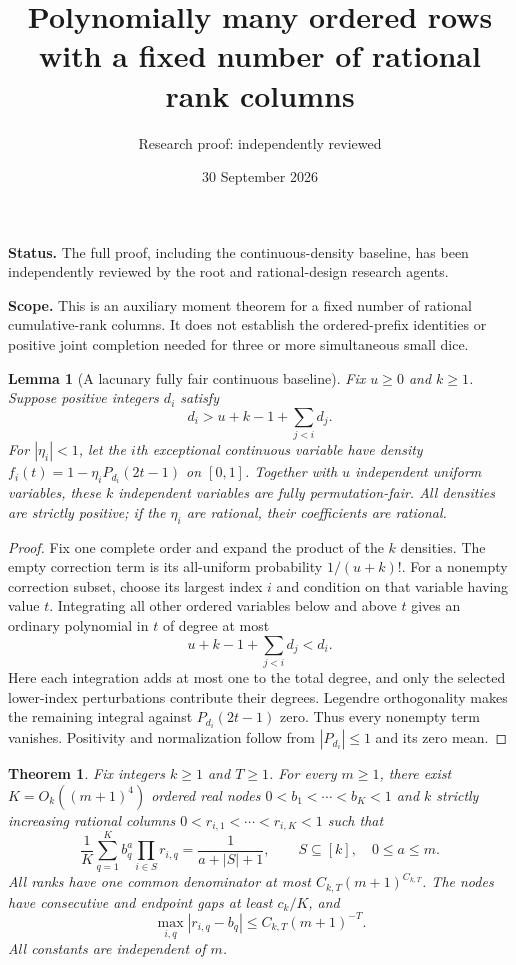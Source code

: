 \documentclass[11pt]{article}
\title{Polynomially many ordered rows with a fixed number of rational rank columns}
\author{Research proof: independently reviewed}
\date{30 September 2026}
\newtheorem{theorem}{Theorem}
\newtheorem{lemma}{Lemma}
\begin{document}
\maketitle
\noindent\textbf{Status.} The full proof, including the continuous-density
baseline, has been independently reviewed by the root and rational-design
research agents.
\medskip

\noindent\textbf{Scope.} This is an auxiliary moment theorem for a fixed
number of rational cumulative-rank columns. It does not establish the
ordered-prefix identities or positive joint completion needed for three
or more simultaneous small dice.

\begin{lemma}[A lacunary fully fair continuous baseline]\label{fullbaseline}
Fix $u\ge0$ and $k\ge1$. Suppose positive integers $d_i$ satisfy
\[
 d_i>u+k-1+\sum_{j<i}d_j.
\]
For $|\eta_i|<1$, let the $i$th exceptional continuous variable have
density $f_i(t)=1-\eta_iP_{d_i}(2t-1)$ on $[0,1]$.
Together with $u$ independent uniform variables, these $k$ independent
variables are fully permutation-fair. All densities are strictly
positive; if the $\eta_i$ are rational, their coefficients are rational.
\end{lemma}
\begin{proof}
Fix one complete order and expand the product of the $k$ densities.
The empty correction term is its all-uniform probability $1/(u+k)!$.
For a nonempty correction subset, choose its largest index $i$ and
condition on that variable having value $t$. Integrating all other
ordered variables below and above $t$ gives an ordinary polynomial in
$t$ of degree at most
\[
 u+k-1+\sum_{j<i}d_j<d_i.
\]
Here each integration adds at most one to the total degree, and only
the selected lower-index perturbations contribute their degrees.
Legendre orthogonality makes the remaining integral against
$P_{d_i}(2t-1)$ zero. Thus every nonempty term vanishes. Positivity
and normalization follow from $|P_{d_i}|\le1$ and its zero mean.
\end{proof}

\begin{theorem}\label{main}
Fix integers $k\ge1$ and $T\ge1$. For every $m\ge1$, there exist
$K=O_k((m+1)^4)$ ordered real nodes $0<b_1<\cdots<b_K<1$ and $k$
strictly increasing rational columns $0<r_{i,1}<\cdots<r_{i,K}<1$ such that
\begin{equation}\label{mom}
 \frac1K\sum_{q=1}^K b_q^a\prod_{i\in S}r_{i,q}
       =\frac1{a+|S|+1},
 \qquad S\subseteq[k],\quad 0\le a\le m.
\end{equation}
All ranks have one common denominator at most
$C_{k,T}(m+1)^{C_{k,T}}$. The nodes have consecutive and endpoint gaps
at least $c_k/K$, and
\[
 \max_{i,q}|r_{i,q}-b_q|\le C_{k,T}(m+1)^{-T}.
\]
All constants are independent of $m$.
\end{theorem}
\end{document}
